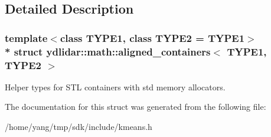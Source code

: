\subsection{Detailed Description}
\subsubsection*{template$<$class T\+Y\+P\+E1, class T\+Y\+P\+E2 = T\+Y\+P\+E1$>$\\*
struct ydlidar\+::math\+::aligned\+\_\+containers$<$ T\+Y\+P\+E1, T\+Y\+P\+E2 $>$}

Helper types for S\+TL containers with std memory allocators. 

The documentation for this struct was generated from the following file\+:\begin{DoxyCompactItemize}
\item 
/home/yang/tmp/sdk/include/kmeans.\+h\end{DoxyCompactItemize}
